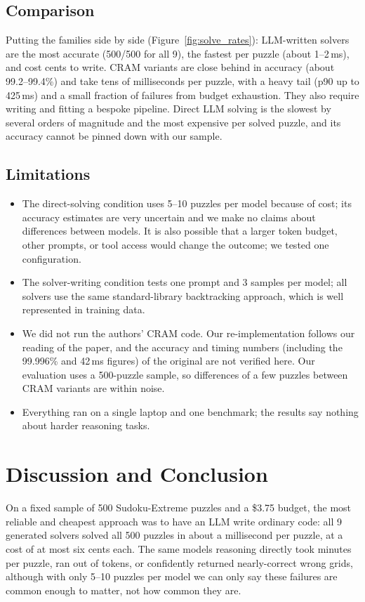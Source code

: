 \documentclass{article} %
\begin{document}
\subsection{Comparison}
Putting the families side by side (Figure~\ref{fig:solve_rates}): LLM-written solvers are the most accurate (500/500 for all 9), the fastest per puzzle (about 1--2\,ms), and cost cents to write. CRAM variants are close behind in accuracy (about 99.2--99.4\%) and take tens of milliseconds per puzzle, with a heavy tail (p90 up to 425\,ms) and a small fraction of failures from budget exhaustion. They also require writing and fitting a bespoke pipeline. Direct LLM solving is the slowest by several orders of magnitude and the most expensive per solved puzzle, and its accuracy cannot be pinned down with our sample.

\subsection{Limitations}
\begin{itemize}
\item The direct-solving condition uses 5--10 puzzles per model because of cost; its accuracy estimates are very uncertain and we make no claims about differences between models. It is also possible that a larger token budget, other prompts, or tool access would change the outcome; we tested one configuration.
\item The solver-writing condition tests one prompt and 3 samples per model; all solvers use the same standard-library backtracking approach, which is well represented in training data.
\item We did not run the authors' CRAM code. Our re-implementation follows our reading of the paper, and the accuracy and timing numbers (including the 99.996\% and 42\,ms figures) of the original are not verified here. Our evaluation uses a 500-puzzle sample, so differences of a few puzzles between CRAM variants are within noise.
\item Everything ran on a single laptop and one benchmark; the results say nothing about harder reasoning tasks.
\end{itemize}

\section{Discussion and Conclusion}
\label{sec:conclusion}
On a fixed sample of 500 Sudoku-Extreme puzzles and a \$3.75 budget, the most reliable and cheapest approach was to have an LLM write ordinary code: all 9 generated solvers solved all 500 puzzles in about a millisecond per puzzle, at a cost of at most six cents each. The same models reasoning directly took minutes per puzzle, ran out of tokens, or confidently returned nearly-correct wrong grids, although with only 5--10 puzzles per model we can only say these failures are common enough to matter, not how common they are.
\end{document}
